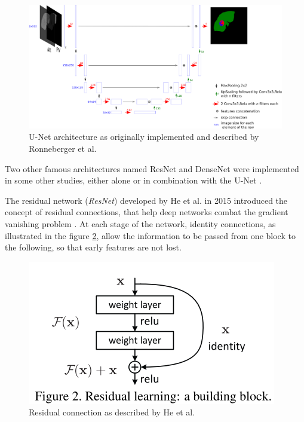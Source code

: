 \documentclass[]{article}
\begin{document}
\begin{figure}[th!]
	\centering
	\includegraphics[width=0.7\linewidth]{images/image28}
	\caption{U-Net architecture as originally implemented and described by Ronneberger et al. \cite{Ronneberger2015}}
	\label{U_Net_Figure}
\end{figure}

Two other famous architectures named ResNet and DenseNet were
implemented in some other studies, either alone or in combination with
the U-Net \cite{Han2017, Chlebus2018, Bi2017, Kaluva2018, Li2018}.

The residual network (\emph{ResNet}) developed by He et al. in
2015 introduced the concept of residual connections, that help deep
networks combat the gradient vanishing problem \cite{He2015}. At each stage of the
network, identity connections, as illustrated in the figure \ref{ResidualConnection_Fig}, allow the
information to be passed from one block to the following, so that early
features are not lost.

\begin{figure}[th!]
	\centering
	\includegraphics[width=0.7\linewidth]{images/image6}
	\caption{Residual connection as described by He et al. \cite{He2015}}
	\label{ResidualConnection_Fig}
\end{figure}
\end{document}
